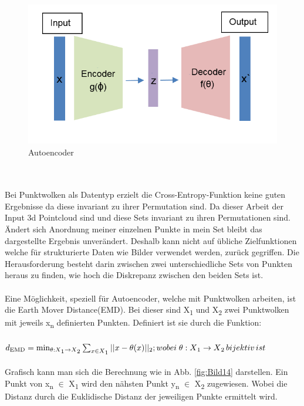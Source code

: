 \documentclass{llncs}
\begin{document}
\begin{figure}[htbp] 
	\centering
	\includegraphics[width=1.0\textwidth]{autoencoder.png}
	\caption{Autoencoder}
	\label{fig:Bild13}
\end{figure}
~\\\\
Bei Punktwolken als Datentyp erzielt die Cross-Entropy-Funktion keine guten Ergebnisse da diese invariant zu ihrer Permutation sind. Da dieser Arbeit der Input 3d Pointcloud sind und diese Sets  invariant zu ihren Permutationen sind. Ändert sich Anordnung meiner einzelnen Punkte in mein Set bleibt das dargestellte Ergebnis unverändert.  Deshalb kann nicht auf übliche Zielfunktionen welche für strukturierte Daten wie Bilder verwendet werden, zurück gegriffen. Die Herausforderung besteht darin zwischen zwei unterschiedliche Sets von Punkten heraus zu finden, wie hoch die Diskrepanz zwischen den beiden Sets ist\cite{invariant}. 
\\\\
Eine Möglichkeit, speziell für Autoencoder, welche mit Punktwolken arbeiten, ist die Earth Mover Distance(EMD). Bei dieser sind X\textsubscript{1} und X\textsubscript{2} zwei Punktwolken mit jeweils x\textsubscript{n} definierten Punkten\cite{autoencoderloss}. Definiert ist sie durch die Funktion:
\\\\
\begin{math}
d\textsubscript{EMD}=\min_{\theta : X\textsubscript{1}\rightarrow X\textsubscript{2}}  \sum_{x\in X\textsubscript{1}}|| x - \theta(x)||\textsubscript{2};wobei\;\theta: X\textsubscript{1} \rightarrow X\textsubscript{2}\, bijektiv\, ist 
\end{math}
\\\\
Grafisch kann man sich die Berechnung wie in Abb. \ref{fig:Bild14} darstellen. Ein Punkt von x\textsubscript{n} $\in$ X\textsubscript{1} wird den nähsten Punkt y\textsubscript{n} $\in$  X\textsubscript{2} zugewiesen. Wobei die Distanz durch die Euklidische Distanz der jeweiligen Punkte ermittelt wird.
 
\end{document}
